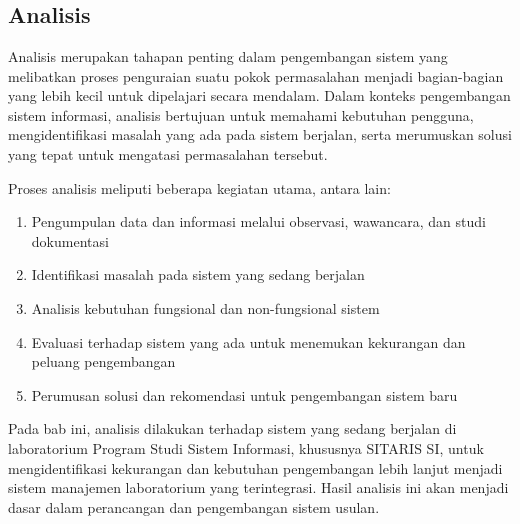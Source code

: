 %
%
%
%


\chapter{\babEmpat}
\section{Analisis}
Analisis merupakan tahapan penting dalam pengembangan sistem yang melibatkan proses penguraian suatu pokok permasalahan menjadi bagian-bagian yang lebih kecil untuk dipelajari secara mendalam. Dalam konteks pengembangan sistem informasi, analisis bertujuan untuk memahami kebutuhan pengguna, mengidentifikasi masalah yang ada pada sistem berjalan, serta merumuskan solusi yang tepat untuk mengatasi permasalahan tersebut.

Proses analisis meliputi beberapa kegiatan utama, antara lain:
\begin{enumerate}
	\item Pengumpulan data dan informasi melalui observasi, wawancara, dan studi dokumentasi
	\item Identifikasi masalah pada sistem yang sedang berjalan
	\item Analisis kebutuhan fungsional dan non-fungsional sistem
	\item Evaluasi terhadap sistem yang ada untuk menemukan kekurangan dan peluang pengembangan
	\item Perumusan solusi dan rekomendasi untuk pengembangan sistem baru
\end{enumerate}

Pada bab ini, analisis dilakukan terhadap sistem yang sedang berjalan di laboratorium Program Studi Sistem Informasi, khususnya SITARIS SI, untuk mengidentifikasi kekurangan dan kebutuhan pengembangan lebih lanjut menjadi sistem manajemen laboratorium yang terintegrasi. Hasil analisis ini akan menjadi dasar dalam perancangan dan pengembangan sistem usulan.

